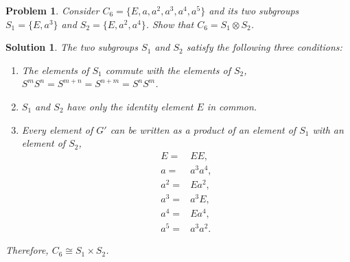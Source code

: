 \documentclass[UTF8,10pt,a4paper]{article}
\theoremstyle{Problem}
\newtheorem{prob}{Problem}
\theoremstyle{Solution}
\newtheorem*{sol}{Solution}
\begin{document}
\begin{prob}
    Consider $C_6=\{E,a,a^2,a^3,a^4,a^5\}$ and its two subgroups $S_1=\{E,a^3\}$ and $S_2=\{E,a^2,a^4\}$. Show that $C_6=S_1\otimes S_2$.
\end{prob}
\begin{sol}
    The two subgroups $S_1$ and $S_2$ satisfy the following three conditions:
    \begin{enumerate}
        \item The elements of $S_1$ commute with the elements of $S_2$, $S^mS^n=S^{m+n}=S^{n+m}=S^nS^m$.
        \item $S_1$ and $S_2$ have only the identity element $E$ in common.
        \item Every element of $G'$ can be written as a product of an element of $S_1$ with an element of $S_2$,
        \begin{align*}
            E=&EE,\\
            a=&a^3a^4,\\
            a^2=&Ea^2,\\
            a^3=&a^3E,\\
            a^4=&Ea^4,\\
            a^5=&a^3a^2.
        \end{align*}
    \end{enumerate}
    Therefore, $C_6\cong S_1\times S_2$.
\end{sol}
\end{document}
